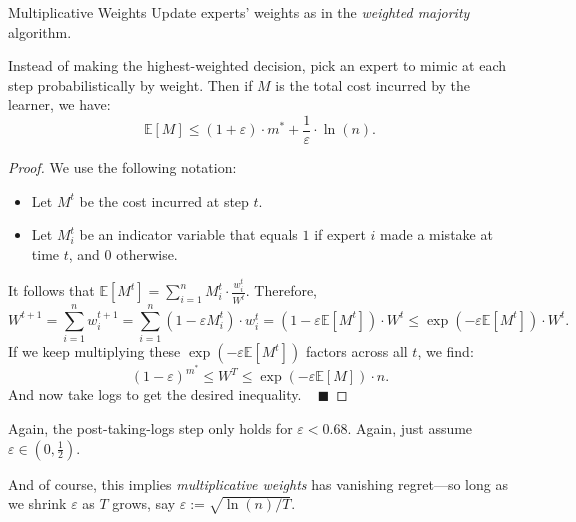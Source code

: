 \begin{solution}{Multiplicative Weights}
    Update experts' weights as in the \emph{weighted majority} algorithm.

    Instead of making the highest-weighted decision, pick an expert to mimic at each step probabilistically by weight.  Then if $M$ is the total cost incurred by the learner, we have:
    \[ \mathbb{E}[M] \leq (1 + \varepsilon) \cdot m^* + \dfrac{1}{\varepsilon} \cdot \ln(n). \]
\end{solution}

\vspace{-0.6cm}

\begin{proof}
    We use the following notation:
    \begin{itemize}
        \item Let $M^t$ be the cost incurred at step $t$.
        \item Let $M_i^t$ be an indicator variable that equals $1$ if expert $i$ made a mistake at time $t$, and $0$ otherwise.
    \end{itemize}
    It follows that $\mathbb{E}[M^t] = \sum_{i = 1}^n M_i^t \cdot \frac{w_i^t}{W^t}$.  Therefore,
    \[ W^{t + 1} = \sum_{i = 1}^n w_i^{t + 1} = \sum_{i = 1}^n (1 - \varepsilon M_i^t) \cdot w_i^t = (1 - \varepsilon \mathbb{E}[M^t]) \cdot W^t \leq \exp\left(-\varepsilon \mathbb{E}[M^t]\right) \cdot W^t.\]
    If we keep multiplying these $\exp \left ( - \varepsilon \mathbb{E}[M^t]\right)$ factors across all $t$, we find:
    \[ (1 - \varepsilon)^{m^*} \leq W^T \leq \exp\left(-\varepsilon \mathbb{E}[M]\right) \cdot n. \]
    And now take logs to get the desired inequality. ~ $\blacksquare$
\end{proof}

\begin{remark}
    Again, the post-taking-logs step only holds for $\varepsilon < 0.68$.  Again, just assume $\varepsilon \in (0, \frac{1}{2})$.
\end{remark}

And of course, this implies \emph{multiplicative weights} has vanishing regret---so long as we shrink $\varepsilon$ as $T$ grows, say $\varepsilon := \sqrt{\ln(n) / T}$.

